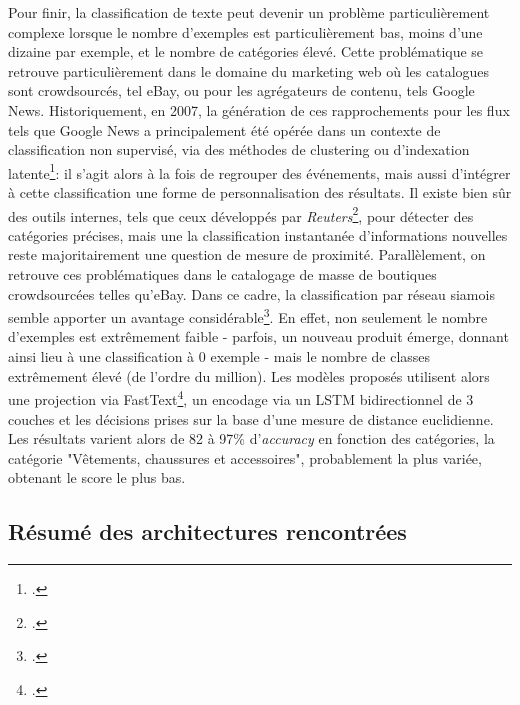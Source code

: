 Pour finir, la classification de texte peut devenir un problème particulièrement complexe lorsque le nombre d'exemples est particulièrement bas, moins d'une dizaine par exemple, et le nombre de catégories élevé. Cette problématique se retrouve particulièrement dans le domaine du marketing web où les catalogues sont crowdsourcés, tel eBay, ou pour les agrégateurs de contenu, tels Google News. Historiquement, en 2007, la génération de ces rapprochements pour les flux tels que Google News a principalement été opérée dans un contexte de classification non supervisé, via des méthodes de clustering ou d'indexation latente\footcite{das_google_2007}: il s'agit alors à la fois de regrouper des événements, mais aussi d'intégrer à cette classification une forme de personnalisation des résultats. Il existe bien sûr des outils internes, tels que ceux développés par \textit{Reuters}\footcite{nugent_comparison_2017}, pour détecter des catégories précises, mais une la classification instantanée d'informations nouvelles reste majoritairement une question de mesure de proximité. Parallèlement, on retrouve ces problématiques dans le catalogage de masse de boutiques crowdsourcées telles qu'eBay. Dans ce cadre, la classification par réseau siamois semble apporter un avantage considérable\footcite{shah_neural_2018}. En effet, non seulement le nombre d'exemples est extrêmement faible  - parfois, un nouveau produit émerge, donnant ainsi lieu à une classification à 0 exemple - mais le nombre de classes extrêmement élevé (de l'ordre du million). Les modèles proposés utilisent alors une projection via FastText\footcite{fasttext}, un encodage via un LSTM bidirectionnel de 3 couches et les décisions prises sur la base d'une mesure de distance euclidienne. Les résultats varient alors de 82 à 97\% d'\textit{accuracy} en fonction des catégories, la catégorie "Vêtements, chaussures et accessoires", probablement la plus variée, obtenant le score le plus bas.

\subsection{Résumé des architectures rencontrées}

